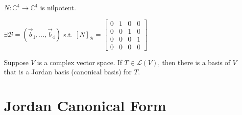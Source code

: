 \documentclass[11pt,fleqn]{book} %
\begin{document}
\begin{example}
    $N: \mathbb{C}^4 \to \mathbb{C}^4$ is nilpotent.

    $\exists \mathcal{B} = (\vec{b}_1, \dots, \vec{b}_4)$ s.t. $[N]_\mathcal{B} = \begin{bmatrix} 0 &1 &0 &0 \\ 0 &0 &1 &0 \\ 0 &0 &0 &1 \\ 0 &0 &0 &0 \end{bmatrix}$
\end{example}

\begin{theorem}
    Suppose $V$ is a complex vector space. If $T \in \mathcal{L}(V)$, then there is a basis of $V$ that is a Jordan basis (canonical basis) for $T$.
\end{theorem}

\section{Jordan Canonical Form}
\end{document}
